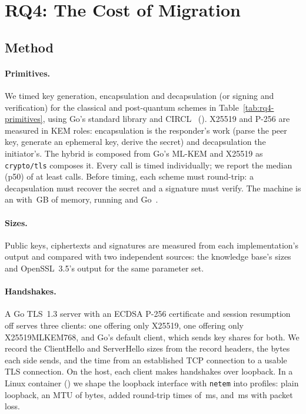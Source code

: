 \section{RQ4: The Cost of Migration}
\label{sec:rq4}

\subsection{Method}

\paragraph{Primitives.} We timed key generation, encapsulation and
decapsulation (or signing and verification) for the classical and
post-quantum schemes in Table~\ref{tab:rq4-primitives}, using Go's standard
library and CIRCL~\cite{circl} (). X25519 and P-256 are
measured in KEM roles: encapsulation is the responder's work (parse the peer
key, generate an ephemeral key, derive the secret) and decapsulation the
initiator's. The hybrid is composed from Go's ML-KEM and X25519 as
\texttt{crypto/tls} composes it. Every call is timed individually; we report
the median (p50) of at least  calls. Before timing,
each scheme must round-trip: a decapsulation must recover the secret and a
signature must verify. The machine is an  with
\,GB of memory, running  and
Go~.

\paragraph{Sizes.} Public keys, ciphertexts and signatures are measured from
each implementation's output and compared with two independent sources: the
knowledge base's sizes and OpenSSL~3.5's output for the same parameter set.

\paragraph{Handshakes.} A Go TLS~1.3 server with an ECDSA P-256 certificate
and session resumption off serves three clients: one offering only X25519,
one offering only X25519MLKEM768, and Go's default client, which sends key
shares for both. We record the ClientHello and ServerHello sizes from the
record headers, the bytes each side sends, and the time from an established
TCP connection to a usable TLS connection. On the host, each client makes
 handshakes over loopback. In a Linux container
() we shape the loopback interface with
\texttt{netem} into  profiles: plain loopback, an MTU
of  bytes, added round-trip times of \,ms,
and \,ms with  packet loss.

